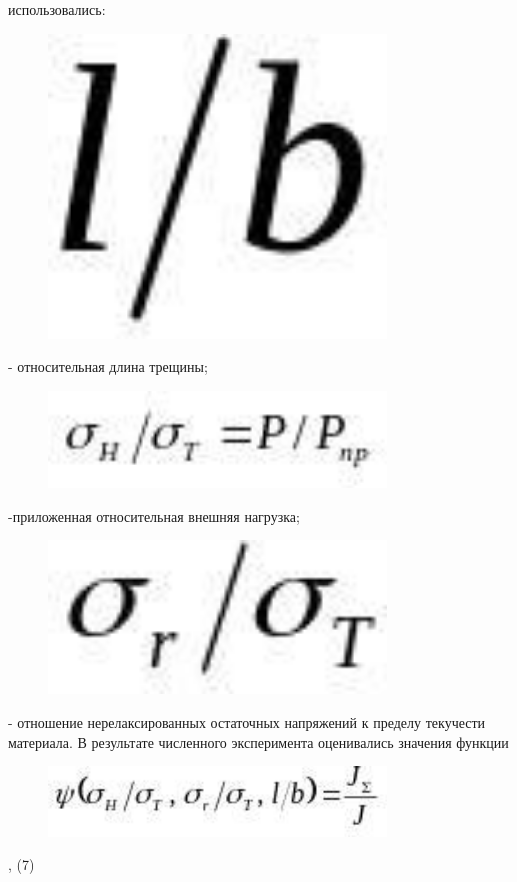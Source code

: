 использовались: \begin{figure}[H]
	\centering
	\includegraphics[width=0.8\textwidth]{assets/1218}
	\caption*{}
\end{figure}- относительная длина
трещины; \begin{figure}[H]
	\centering
	\includegraphics[width=0.8\textwidth]{assets/1219}
	\caption*{}
\end{figure}-приложенная относительная
внешняя нагрузка; \begin{figure}[H]
	\centering
	\includegraphics[width=0.8\textwidth]{assets/1220}
	\caption*{}
\end{figure}- отношение
нерелаксированных остаточных напряжений к пределу текучести материала. В
результате численного эксперимента оценивались значения функции

\begin{figure}[H]
	\centering
	\includegraphics[width=0.8\textwidth]{assets/1221}
	\caption*{}
\end{figure}, (7)

